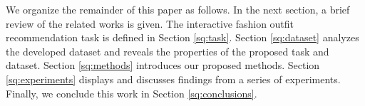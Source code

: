 We organize the remainder of this paper as follows. In the next section, a brief review of the related works is given. The interactive fashion outfit recommendation task is defined in Section \ref{sq:task}. Section \ref{sq:dataset} analyzes the developed dataset and reveals the properties of the proposed task and dataset. Section \ref{sq:methods} introduces our proposed methods. Section \ref{sq:experiments} displays and discusses findings from a series of experiments. Finally, we conclude this work in Section \ref{sq:conclusions}.